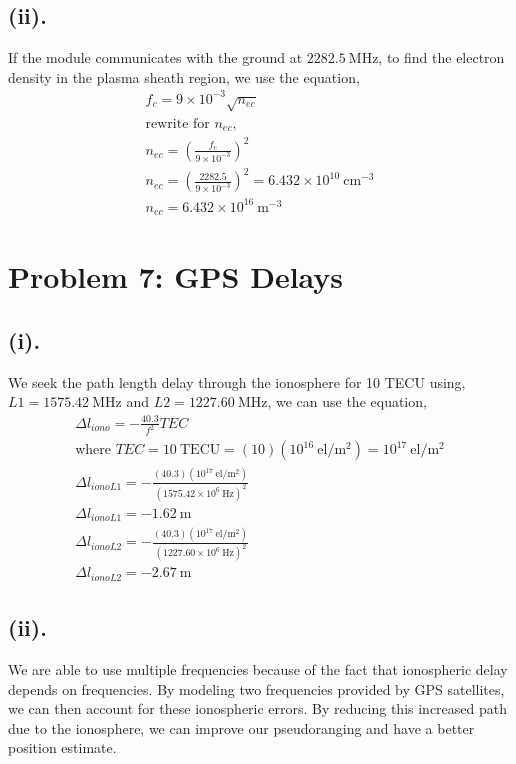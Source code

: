 \documentclass[11pt]{article}
\begin{document}
\subsection*{(ii).}
\hspace*{2em}If the module communicates with the ground at $2282.5~\mathrm{MHz}$, to find
the electron density in the plasma sheath region, we use the equation,
\begin{gather*}
f_c = 9\times10^{-3}\sqrt{n_{ec}} \\
\text{rewrite for } n_{ec} \text{,}\\
n_{ec} = (\frac{f_c}{9\times10^{-3}})^2 \\
n_{ec} = \left(\frac{2282.5}{9\times10^{-3}}\right)^2 = 6.432\times10^{10}~\mathrm{cm^{-3}} \\
\boxed{n_{ec} = 6.432\times10^{16}~\mathrm{m^{-3}}}
\end{gather*}

\newpage
\section*{Problem 7: GPS Delays}
\subsection*{(i).}
\hspace*{2em}We seek the path length delay through the ionosphere for 10 TECU using,
$L1 = 1575.42~\mathrm{MHz}$ and $L2 = 1227.60~\mathrm{MHz}$, we can use the equation,
\begin{gather*}
\Delta l_{iono} = -\frac{40.3}{f^2}TEC \\
\text{where } TEC = 10~\mathrm{TECU} = (10)(10^{16}~\mathrm{el/m^2}) = 10^{17}~\mathrm{el/m^2} \\
\Delta l_{iono L1} = -\frac{(40.3)(10^{17}~\mathrm{el/m^2})}{(1575.42\times10^{6}~\mathrm{Hz})^2} \\
\boxed{\Delta l_{iono L1} = -1.62~\mathrm{m}}\\
\Delta l_{iono L2} = -\frac{(40.3)(10^{17}~\mathrm{el/m^2})}{(1227.60\times10^{6}~\mathrm{Hz})^2} \\
\boxed{\Delta l_{iono L2} = -2.67~\mathrm{m}}
\end{gather*}
\subsection*{(ii).}
\hspace*{2em}We are able to use multiple frequencies because of the fact that ionospheric
delay depends on frequencies. By modeling two frequencies provided by GPS satellites, we can
then account for these ionospheric errors. By reducing this increased path due to the 
ionosphere, we can improve our pseudoranging and have a better position estimate.
\end{document}
